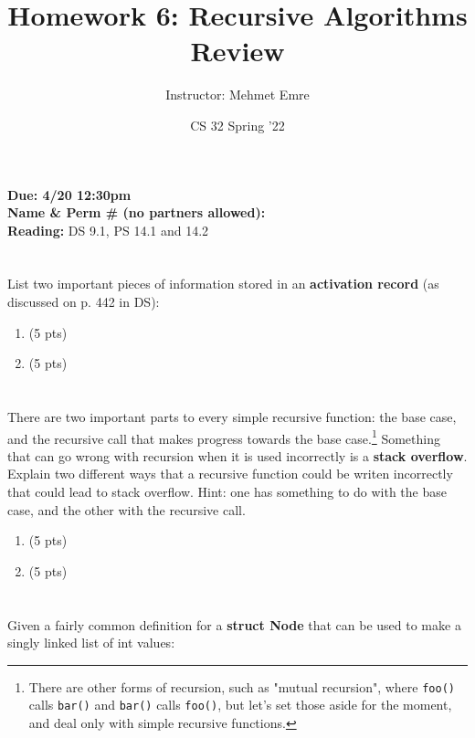 \documentclass[11pt]{article}
\author{Instructor: Mehmet Emre}
\date{CS 32 Spring '22}
\title{Homework 6: Recursive Algorithms Review}
\begin{document}
\maketitle
\textbf{Due: 4/20 12:30pm} \\ 
\vspace{1em}
\textbf{Name \& Perm \# (no partners allowed):} \\ 
\vspace{1em}
\textbf{Reading:} DS 9.1, PS 14.1 and 14.2


\section{}
\label{sec:org47c0ffe}
List two important pieces of information stored in an \textbf{activation record} (as
discussed on p. 442 in DS):
\begin{enumerate}
\item (5 pts)
\vspace{3em}
\item (5 pts)
\vspace{3em}
\end{enumerate}

\section{}
\label{sec:orgdfdbaaf}
There are two important parts to every simple recursive function: the base
case, and the recursive call that makes progress towards the base
case.\footnote{There are other forms of recursion, such as "mutual recursion", where
\texttt{foo()} calls \texttt{bar()} and \texttt{bar()} calls \texttt{foo()}, but let's set those aside for
the moment, and deal only with simple recursive functions.} Something that can
go wrong with recursion when it is used incorrectly is a \textbf{stack
overflow}. Explain two different ways that a recursive function could be writen
incorrectly that could lead to stack overflow. Hint: one has something to do
with the base case, and the other with the recursive call.
\begin{enumerate}
\item (5 pts)
\vspace{6em}
\item (5 pts)
\end{enumerate}

\newpage

\section{}
\label{sec:org79a0610}
Given a fairly common definition for a \textbf{struct Node} that can be used to make
a singly linked list of int values:
\end{document}
